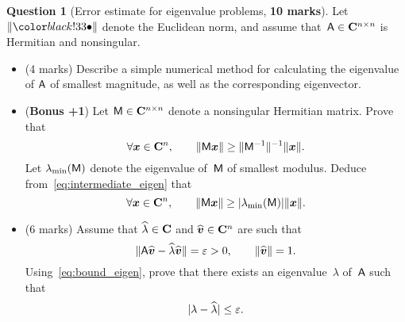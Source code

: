 \documentclass[11pt]{article}
\theoremstyle{definition}
\newtheorem{question}{Question}
\begin{document}


\newpage
\begin{question}
    [Error estimate for eigenvalue problems, \textbf{10 marks}]
    Let $\norm{\placeholder}$ denote the Euclidean norm,
    and assume that~$\mathsf A \in \mathbf C^{n \times n}$ is Hermitian and nonsingular.

    \begin{itemize}
        \item
            (4 marks)
            Describe a simple numerical method for calculating the eigenvalue of $\mathsf A$ of smallest magnitude,
            as well as the corresponding eigenvector.

        \item
            (\textbf{Bonus +1})
            Let $\mathsf M \in \mathbf C^{n \times n}$ denote a nonsingular Hermitian matrix.
            Prove that
            \begin{equation}
                \label{eq:intermediate_eigen}
                \forall \mathbf{\boldsymbol{x}} \in \mathbf C^n, \qquad
                \lVert\mathsf M \mathbf{\boldsymbol{x}}\rVert \geq \lVert\mathsf M^{-1}\rVert^{-1} \lVert\mathbf{\boldsymbol{x}}\rVert.
            \end{equation}
            Let $\lambda_{\min}(\mathsf M)$ denote the eigenvalue of~$\mathsf M$ of smallest modulus.
            Deduce from~\eqref{eq:intermediate_eigen} that
            \begin{equation}
                \label{eq:bound_eigen}
                \forall \mathbf{\boldsymbol{x}} \in \mathbf C^n, \qquad
                \lVert\mathsf M \mathbf{\boldsymbol{x}}\rVert \geq \lvert\lambda_{\min}(\mathsf M)\rvert \lVert\mathbf{\boldsymbol{x}}\rVert.
            \end{equation}

        \item
            (6 marks)
            Assume that $\widehat \lambda \in \mathbf C$ and $\widehat{\mathbf{\boldsymbol{v}}} \in \mathbf C^n$ are such that
            \begin{equation}
                \label{eq:bound}
                \lVert\mathsf A \widehat{\mathbf{\boldsymbol{v}}} - \widehat{\lambda} \widehat{\mathbf{\boldsymbol{v}}}\rVert = \varepsilon > 0,
                \qquad \lVert\widehat {\mathbf{\boldsymbol{v}}}\rVert = 1.
            \end{equation}
            Using~\eqref{eq:bound_eigen},
            prove that there exists an eigenvalue~$\lambda$ of~$\mathsf A$ such that
            \[
                \lvert\lambda - \widehat \lambda\rvert \leq \varepsilon.
            \]


\end{itemize}
\end{question}
\end{document}
